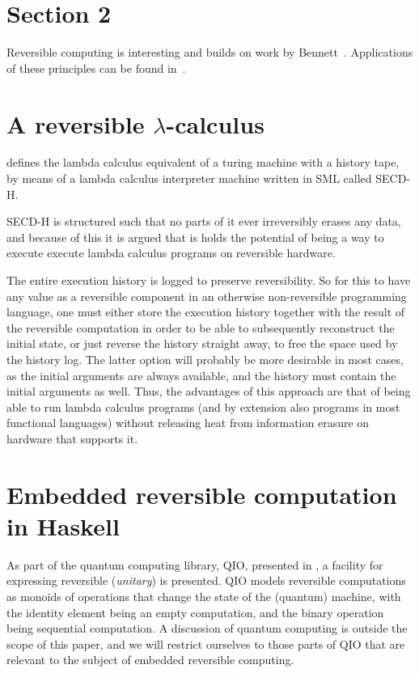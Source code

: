 \documentclass[10pt]{sigplanconf}
\begin{document}
\section{Section 2}
Reversible computing is interesting and builds on work by
Bennett~\cite{Bennett:1982}. Applications of these principles can be found
in~\cite{ThomsenAxelsen:2009:PPL,YokoyamaGlueck:2007:Janus}.


\section{A reversible $\lambda$-calculus}
\cite{huelsbergen1996logically} defines the lambda calculus equivalent of a
turing machine with a history tape, by means of a lambda calculus interpreter
machine written in SML called SECD-H.

SECD-H is structured such that no parts of it ever irreversibly erases any
data, and because of this it is argued that is holds the potential of being a
way to execute execute lambda calculus programs on reversible hardware.

The entire execution history is logged to preserve reversibility. So for this
to have any value as a reversible component in an otherwise non-reversible
programming language, one must either store the execution history together with
the result of the reversible computation in order to be able to subsequently
reconstruct the initial state, or just reverse the history straight away, to
free the space used by the history log. The latter option will probably be more
desirable in most cases, as the initial arguments are always available, and the
history must contain the initial arguments as well. Thus, the advantages of
this approach are that of being able to run lambda calculus programs (and by
extension also programs in most functional languages) without releasing heat
from information erasure on hardware that supports it.


\section{Embedded reversible computation in Haskell}

As part of the quantum computing library, QIO, presented in
\cite{altenkirchquantum}, a facility for expressing reversible
(\textit{unitary}) is presented.  QIO models reversible computations
as monoids of operations that change the state of the (quantum)
machine, with the identity element being an empty computation, and the
binary operation being sequential computation.  A discussion of
quantum computing is outside the scope of this paper, and we will
restrict ourselves to those parts of QIO that are relevant to the
subject of embedded reversible computing.
\end{document}
